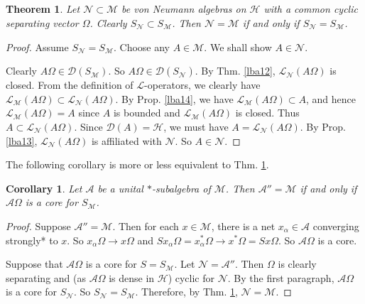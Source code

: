 \documentclass[12pt,b5paper,notitlepage]{article}
\theoremstyle{definition}
\theoremstyle{plain}
\newtheorem{thm}[df]{Theorem}
\newtheorem{co}[df]{Corollary}
\newcommand{\mc}{\mathcal}
\newcommand{\Dom}{\scr{D}}
\newcommand{\scr}{\mathscr}
\numberwithin{equation}{section}
\begin{document}
\subsection{}


\begin{thm}\label{lba15}
Let $\mc N\subset\mc M$ be von Neumann algebras on $\mc H$ with a common cyclic separating vector $\Omega$. Clearly $S_{\mc N}\subset S_{\mc M}$. Then $\mc N=\mc M$ if and only if $S_{\mc N}=S_{\mc M}$.
\end{thm}



\begin{proof}
Assume $S_{\mc N}=S_{\mc M}$. Choose any $A\in\mc M$. We shall show $A\in\mc N$. 


Clearly $A\Omega\in\Dom(S_{\mc M})$. So $A\Omega\in\Dom(S_{\mc N})$. By Thm. \ref{lba12},  $\scr L_{\mc N}(A\Omega)$ is  closed. From the definition of $\scr L$-operators, we clearly have $\scr L_{\mc M}(A\Omega)\subset\scr L_{\mc N}(A\Omega)$. By Prop. \ref{lba14}, we have $\scr L_{\mc M}(A\Omega)\subset A$, and hence $\scr L_{\mc M}(A\Omega)=A$ since $A$ is bounded and $\scr L_{\mc M}(A\Omega)$ is closed. Thus $A\subset\scr L_{\mc N}(A\Omega)$. Since $\Dom(A)=\mc H$, we must have $A=\scr L_{\mc N}(A\Omega)$. By Prop. \ref{lba13}, $\scr L_{\mc N}(A\Omega)$ is affiliated with $\mc N$. So $A\in\mc N$.
\end{proof}











The following corollary is more or less equivalent to Thm. \ref{lba15}.

\begin{co}\label{lba16}
Let $\mc A$ be a unital $*$-subalgebra of $\mc M$. Then $\mc A''=\mc M$ if and only if $\mc A\Omega$ is a core for $S_{\mc M}$.
\end{co}

\begin{proof}
Suppose $\mc A''=\mc M$. Then for each $x\in\mc M$, there is a net $x_\alpha\in\mc A$ converging strongly* to $x$. So $x_\alpha\Omega\rightarrow x\Omega$ and $Sx_\alpha\Omega=x_\alpha^*\Omega\rightarrow x^*\Omega=Sx\Omega$. So $\mc A\Omega$ is a core.

Suppose that $\mc A\Omega$ is a core for $S=S_{\mc M}$. Let $\mc N=\mc A''$. Then $\Omega$ is clearly separating and (as $\mc A\Omega$ is dense in $\mc H$) cyclic for $\mc N$. By the first paragraph, $\mc A\Omega$ is a core for $S_{\mc N}$. So $S_{\mc N}=S_{\mc M}$. Therefore, by Thm. \ref{lba15}, $\mc N=\mc M$.
\end{proof}
\end{document}
